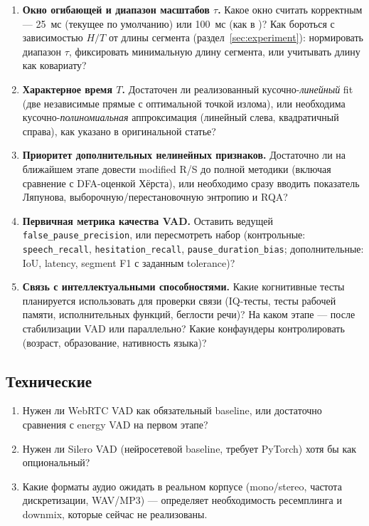 \documentclass[12pt,a4paper]{article}
\begin{document}
\begin{enumerate}
  \item \textbf{Окно огибающей и диапазон масштабов $\tau$.} Какое окно
   считать корректным — 25~мс (текущее по умолчанию) или 100~мс (как в
   \cite{kuzenkov2014})? Как бороться с зависимостью $H/T$ от длины
   сегмента (раздел~\ref{sec:experiment}): нормировать диапазон $\tau$,
   фиксировать минимальную длину сегмента, или учитывать длину как
   ковариату?
  \item \textbf{Характерное время $T$.} Достаточен ли реализованный
   кусочно-\emph{линейный} fit (две независимые прямые с оптимальной точкой
   излома), или необходима кусочно-\emph{полиномиальная} аппроксимация
   (линейный слева, квадратичный справа), как указано в оригинальной
   статье?
  \item \textbf{Приоритет дополнительных нелинейных признаков.} Достаточно
   ли на ближайшем этапе довести modified R/S до полной методики
   (включая сравнение с DFA-оценкой Хёрста), или необходимо сразу вводить
   показатель Ляпунова, выборочную/перестановочную энтропию и RQA?
  \item \textbf{Первичная метрика качества VAD.} Оставить ведущей
   \texttt{false\_pause\_precision}, или пересмотреть набор (контрольные:
   \texttt{speech\_recall}, \texttt{hesitation\_recall},
   \texttt{pause\_duration\_bias}; дополнительные: IoU, latency, segment
   F1 с заданным tolerance)?
  \item \textbf{Связь с интеллектуальными способностями.} Какие когнитивные
   тесты планируется использовать для проверки связи (IQ-тесты, тесты
   рабочей памяти, исполнительных функций, беглости речи)? На каком этапе
   — после стабилизации VAD или параллельно? Какие конфаундеры
   контролировать (возраст, образование, нативность языка)?
\end{enumerate}

\subsection{Технические}

\begin{enumerate}
  \item Нужен ли WebRTC VAD как обязательный baseline, или достаточно
   сравнения с energy VAD на первом этапе?
  \item Нужен ли Silero VAD (нейросетевой baseline, требует PyTorch) хотя бы
   как опциональный?
  \item Какие форматы аудио ожидать в реальном корпусе (mono/stereo,
   частота дискретизации, WAV/MP3) — определяет необходимость ресемплинга и
   downmix, которые сейчас не реализованы.
\end{enumerate}
\end{document}
